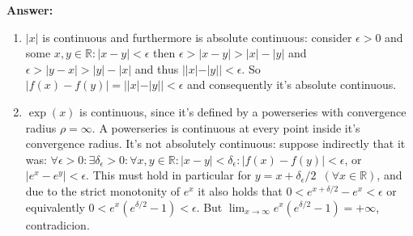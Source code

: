 \documentclass[11pt]{article}
\newcommand{\abs}[1]{\left|#1\right|}
\begin{document}
\begin{enumerate}
\textbf{Answer:} 
\begin{enumerate}
    \item $|x|$ is continuous and furthermore is absolute continuous: consider $\epsilon > 0$ and some $x, y \in \mathbb{R}\colon |x - y| < \epsilon$ then $\epsilon > |x - y| > |x| - |y|$ and $\epsilon > |y - x| > |y| - |x|$ and thus $||x| - |y|| < \epsilon$. So $|f(x) - f(y)| = ||x| - |y|| < \epsilon$ and consequently it's absolute continuous.
    \item $\operatorname{exp}(x)$ is continuous, since it's defined by a powerseries with convergence radius $\rho = \infty$. A powerseries is continuous at every point inside it's convergence radius. It's not absolutely continuous: suppose indirectly that it was: $\forall \epsilon > 0\colon \exists \delta_\epsilon >0\colon \forall x, y \in \mathbb{R}: \abs{x - y} < \delta_\epsilon\colon \abs{f(x) - f(y)} < \epsilon$, or $\abs{e^x - e^y} < \epsilon$. This must hold in particular for $y = x + \delta_\epsilon/2\phantom{0}(\forall x \in \mathbb{R})$, and due to the strict monotonity of $e^x$ it also holds that $0 < e^{x+\delta/2} - e^x < \epsilon$ or equivalently $0 < e^x(e^{\delta/2} - 1) < \epsilon$. But $\lim_{x\to\infty} e^x(e^{\delta/2} - 1) = +\infty$, contradicion.
    

\end{enumerate}
\end{enumerate}
\end{document}
